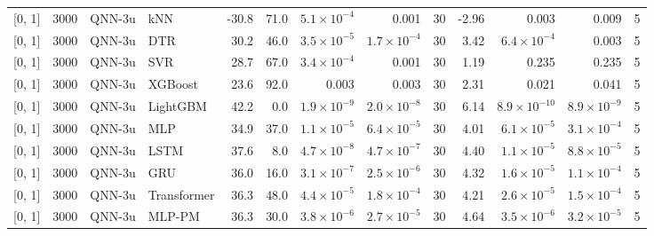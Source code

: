 \begin{longtable}{lrllrrrrrrrrr}
{[0, 1]} & 3000 & QNN-3u & kNN & -30.8 & 71.0 & $5.1 \times 10^{-4}$ & 0.001 & 30 & -2.96 & 0.003 & 0.009 & 5 \\
{[0, 1]} & 3000 & QNN-3u & DTR & 30.2 & 46.0 & $3.5 \times 10^{-5}$ & $1.7 \times 10^{-4}$ & 30 & 3.42 & $6.4 \times 10^{-4}$ & 0.003 & 5 \\
{[0, 1]} & 3000 & QNN-3u & SVR & 28.7 & 67.0 & $3.4 \times 10^{-4}$ & 0.001 & 30 & 1.19 & 0.235 & 0.235 & 5 \\
{[0, 1]} & 3000 & QNN-3u & XGBoost & 23.6 & 92.0 & 0.003 & 0.003 & 30 & 2.31 & 0.021 & 0.041 & 5 \\
{[0, 1]} & 3000 & QNN-3u & LightGBM & 42.2 & 0.0 & $1.9 \times 10^{-9}$ & $2.0 \times 10^{-8}$ & 30 & 6.14 & $8.9 \times 10^{-10}$ & $8.9 \times 10^{-9}$ & 5 \\
{[0, 1]} & 3000 & QNN-3u & MLP & 34.9 & 37.0 & $1.1 \times 10^{-5}$ & $6.4 \times 10^{-5}$ & 30 & 4.01 & $6.1 \times 10^{-5}$ & $3.1 \times 10^{-4}$ & 5 \\
{[0, 1]} & 3000 & QNN-3u & LSTM & 37.6 & 8.0 & $4.7 \times 10^{-8}$ & $4.7 \times 10^{-7}$ & 30 & 4.40 & $1.1 \times 10^{-5}$ & $8.8 \times 10^{-5}$ & 5 \\
{[0, 1]} & 3000 & QNN-3u & GRU & 36.0 & 16.0 & $3.1 \times 10^{-7}$ & $2.5 \times 10^{-6}$ & 30 & 4.32 & $1.6 \times 10^{-5}$ & $1.1 \times 10^{-4}$ & 5 \\
{[0, 1]} & 3000 & QNN-3u & Transformer & 36.3 & 48.0 & $4.4 \times 10^{-5}$ & $1.8 \times 10^{-4}$ & 30 & 4.21 & $2.6 \times 10^{-5}$ & $1.5 \times 10^{-4}$ & 5 \\
{[0, 1]} & 3000 & QNN-3u & MLP-PM & 36.3 & 30.0 & $3.8 \times 10^{-6}$ & $2.7 \times 10^{-5}$ & 30 & 4.64 & $3.5 \times 10^{-6}$ & $3.2 \times 10^{-5}$ & 5 \\
\end{longtable}
\par{}

